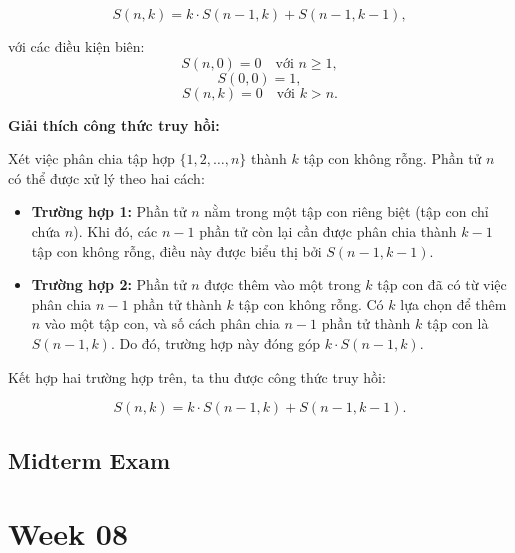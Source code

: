 \documentclass[a4paper,12pt]{article}
\begin{document}
\[
S(n, k) = k \cdot S(n-1, k) + S(n-1, k-1),
\]

với các điều kiện biên:
\[
S(n, 0) = 0 \quad \text{với } n \geq 1,
\]
\[
S(0, 0) = 1,
\]
\[
S(n, k) = 0 \quad \text{với } k > n.
\]

\textbf{Giải thích công thức truy hồi:}

Xét việc phân chia tập hợp \( \{1, 2, \ldots, n\} \) thành \( k \) tập con không rỗng. Phần tử \( n \) có thể được xử lý theo hai cách:
\begin{itemize}
    \item \textbf{Trường hợp 1:} Phần tử \( n \) nằm trong một tập con riêng biệt (tập con chỉ chứa \( n \)). Khi đó, các \( n-1 \) phần tử còn lại cần được phân chia thành \( k-1 \) tập con không rỗng, điều này được biểu thị bởi \( S(n-1, k-1) \).
    \item \textbf{Trường hợp 2:} Phần tử \( n \) được thêm vào một trong \( k \) tập con đã có từ việc phân chia \( n-1 \) phần tử thành \( k \) tập con không rỗng. Có \( k \) lựa chọn để thêm \( n \) vào một tập con, và số cách phân chia \( n-1 \) phần tử thành \( k \) tập con là \( S(n-1, k) \). Do đó, trường hợp này đóng góp \( k \cdot S(n-1, k) \).
\end{itemize}

Kết hợp hai trường hợp trên, ta thu được công thức truy hồi:

\[
S(n, k) = k \cdot S(n-1, k) + S(n-1, k-1).
\]

\subsection*{Midterm Exam}

\section*{Week 08}
\subsection*{}
\end{document}
